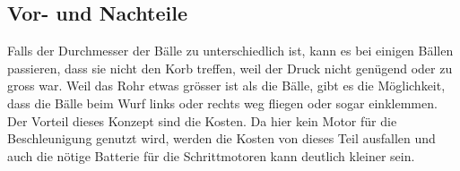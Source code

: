 \subsection{Vor- und Nachteile}
Falls der Durchmesser der Bälle zu unterschiedlich ist, kann es bei einigen Bällen passieren, dass sie nicht den Korb treffen, weil der Druck nicht genügend oder zu gross war. Weil das Rohr etwas grösser ist als die Bälle, gibt es die Möglichkeit, dass die Bälle beim Wurf links oder rechts weg fliegen oder sogar einklemmen. Der Vorteil dieses Konzept sind die Kosten. Da hier kein Motor für die Beschleunigung genutzt wird, werden die Kosten von dieses Teil ausfallen und auch die nötige Batterie für die Schrittmotoren kann deutlich kleiner sein.
